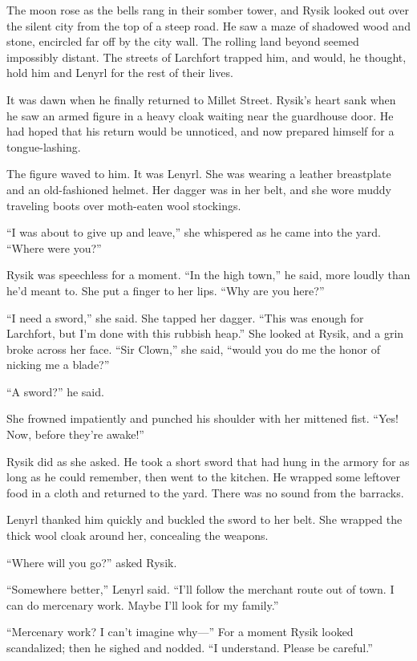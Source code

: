 \documentclass[10pt,b5paper]{article}
\begin{document}
The moon rose as the bells rang in their somber tower, and Rysik
looked out over the silent city from the top of a steep road. He
saw a maze of shadowed wood and stone, encircled far off by the
city wall. The rolling land beyond seemed impossibly distant.
The streets of Larchfort trapped him, and would, he thought, hold
him and Lenyrl for the rest of their lives.

It was dawn when he finally returned to Millet Street. Rysik's heart
sank when he saw an armed figure in a heavy cloak waiting near the
guardhouse door. He had hoped that his return would be unnoticed,
and now prepared himself for a tongue-lashing.

The figure waved to him. It was Lenyrl. She was wearing a leather
breastplate and an old-fashioned helmet. Her dagger was in her belt,
and she wore muddy traveling boots over moth-eaten wool stockings.

``I was about to give up and leave,'' she whispered as he came into
the yard. ``Where were you?''

Rysik was speechless for a moment. ``In the high town,'' he said,
more loudly than he'd meant to. She put a finger to her lips.
``Why are you here?''

``I need a sword,'' she said. She tapped her dagger. ``This was enough
for Larchfort, but I'm done with this rubbish heap.'' She looked
at Rysik, and a grin broke across her face. ``Sir Clown,'' she said,
``would you do me the honor of nicking me a blade?''

``A sword?'' he said.

She frowned impatiently and punched his shoulder with her mittened
fist. ``Yes! Now, before they're awake!''

Rysik did as she asked. He took a short sword that had hung in
the armory for as long as he could remember, then went to the
kitchen. He wrapped some leftover food in a cloth and returned to
the yard. There was no sound from the barracks.

Lenyrl thanked him quickly and buckled the sword to her belt. She
wrapped the thick wool cloak around her, concealing the weapons.

``Where will you go?'' asked Rysik.

``Somewhere better,'' Lenyrl said. ``I'll follow the merchant route
out of town. I can do mercenary work. Maybe I'll look for my family.''

``Mercenary work? I can't imagine why---'' For a moment Rysik looked
scandalized; then he sighed and nodded. ``I understand. Please
be careful.''
\end{document}
